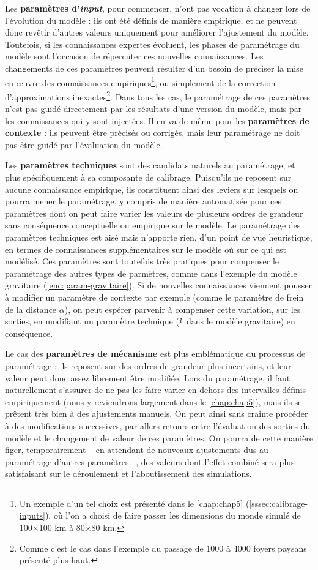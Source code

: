 Les \textbf{paramètres d'\textit{input}}, pour commencer, n'ont pas vocation à changer lors de l'évolution du modèle : ils ont été définis de manière empirique, et ne peuvent donc revêtir d'autres valeurs uniquement pour améliorer l'ajustement du modèle.
Toutefois, si les connaissances expertes évoluent, les phases de paramétrage du modèle sont l'occasion de répercuter ces nouvelles connaissances.
Les changements de ces paramètres peuvent résulter d'un besoin de préciser la mise en œuvre des connaissances empiriques\footnote{
	Un exemple d'un tel choix est présenté dans le \cref{chap:chap5} (\cref{sssec:calibrage-inputs}), où l'on a choisi de faire passer les dimensions du monde simulé de 100×100 km à 80×80 km.
}, ou simplement de la correction d'approximations inexactes\footnote{
	Comme c'est le cas dans l'exemple du passage de 1000 à 4000 foyers paysans présenté plus haut.
}.
Dans tous les cas, le paramétrage de ces paramètres n'est pas guidé directement par les résultats d'une version du modèle, mais par les connaissances qui y sont injectées.
Il en va de même pour les \textbf{paramètres de contexte} : ils peuvent être précisés ou corrigés, mais leur paramétrage ne doit pas être guidé par l'évaluation du modèle.

Les \textbf{paramètres techniques} sont des candidats naturels au paramétrage, et plus spécifiquement à sa composante de calibrage.
Puisqu'ils ne reposent sur aucune connaissance empirique, ils constituent ainsi des \og leviers\fg{} sur lesquels on pourra mener le paramétrage, y compris de manière automatisée pour ces paramètres dont on peut faire varier les valeurs de plusieurs ordres de grandeur sans conséquence conceptuelle ou empirique sur le modèle.
Le paramétrage des paramètres techniques est aisé mais n'apporte rien, d'un point de vue heuristique, en termes de connaissances supplémentaires sur le modèle où sur ce qui est modélisé.
Ces paramètres sont toutefois très \og pratiques\fg{} pour compenser le paramétrage des autres types de parmètres, comme dans l'exemple du modèle gravitaire (\cref{enc:param-gravitaire}).
Si de nouvelles connaissances viennent pousser à modifier un paramètre de contexte par exemple (comme le paramètre de frein de la distance $\alpha$), on peut espérer parvenir à compenser cette variation, sur les sorties, en modifiant un paramètre technique ($k$ dans le modèle gravitaire) en conséquence.

Le cas des \textbf{paramètres de mécanisme} est plus emblématique du processus de paramétrage : ils reposent sur des ordres de grandeur plus incertains, et leur valeur peut donc assez librement être modifiée.
Lors du paramétrage, il faut naturellement s'assurer de ne pas les faire varier en dehors des intervalles définis empiriquement (nous y reviendrons largement dans le \cref{chap:chap5}), mais ils se prêtent très bien à des ajustements manuels.
On peut ainsi sans crainte procéder à des modifications successives, par allers-retours entre l'évaluation des sorties du modèle et le changement de valeur de ces paramètres.
On pourra de cette manière figer, temporairement -- en attendant de nouveaux ajustements dus au paramétrage d'autres paramètres --, des valeurs dont l'effet combiné sera plus satisfaisant sur le déroulement et l'aboutissement des simulations.

